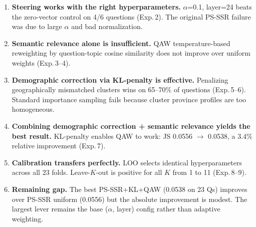 \documentclass[10pt,a4paper]{article}
\begin{document}
\begin{enumerate}[leftmargin=*,itemsep=2pt]
\item \textbf{Steering works with the right hyperparameters.} $\alpha$=0.1, layer=24 beats the zero-vector control on 4/6 questions (Exp.\,2). The original PS-SSR failure was due to large $\alpha$ and bad normalization.

\item \textbf{Semantic relevance alone is insufficient.} QAW temperature-based reweighting by question-topic cosine similarity does not improve over uniform weights (Exp.\,3--4).

\item \textbf{Demographic correction via KL-penalty is effective.} Penalizing geographically mismatched clusters wins on 65--70\% of questions (Exp.\,5--6). Standard importance sampling fails because cluster province profiles are too homogeneous.

\item \textbf{Combining demographic correction + semantic relevance yields the best result.} KL-penalty enables QAW to work: JS 0.0556 $\rightarrow$ 0.0538, a 3.4\% relative improvement (Exp.\,7).

\item \textbf{Calibration transfers perfectly.} LOO selects identical hyperparameters across all 23 folds. Leave-$K$-out is positive for all $K$ from 1 to 11 (Exp.\,8--9).

\item \textbf{Remaining gap.} The best PS-SSR+KL+QAW (0.0538 on 23 Qs) improves over PS-SSR uniform (0.0556) but the absolute improvement is modest. The largest lever remains the base ($\alpha$, layer) config rather than adaptive weighting.
\end{enumerate}
\end{document}
